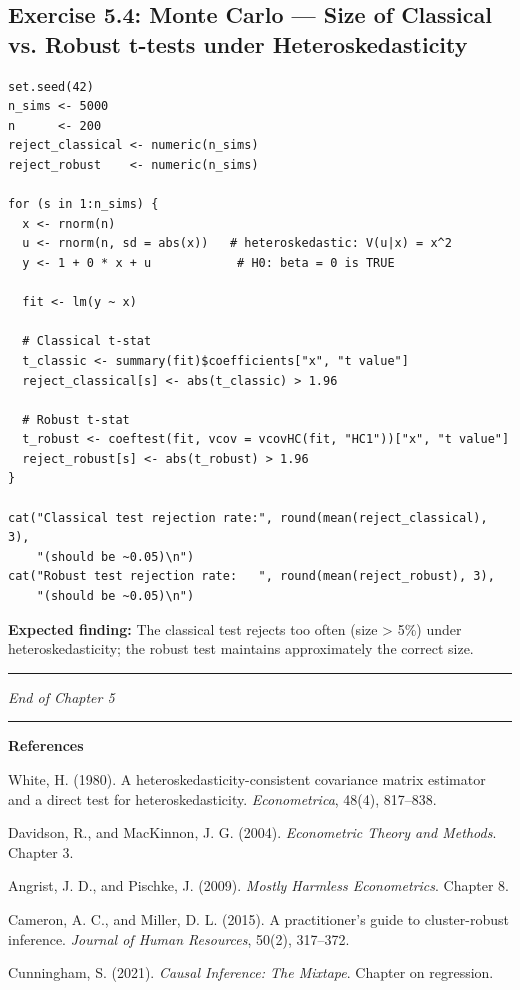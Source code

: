 \subsection{Exercise 5.4: Monte Carlo --- Size of Classical vs. Robust t-tests under Heteroskedasticity}

\begin{lstlisting}
set.seed(42)
n_sims <- 5000
n      <- 200
reject_classical <- numeric(n_sims)
reject_robust    <- numeric(n_sims)

for (s in 1:n_sims) {
  x <- rnorm(n)
  u <- rnorm(n, sd = abs(x))   # heteroskedastic: V(u|x) = x^2
  y <- 1 + 0 * x + u            # H0: beta = 0 is TRUE

  fit <- lm(y ~ x)
  
  # Classical t-stat
  t_classic <- summary(fit)$coefficients["x", "t value"]
  reject_classical[s] <- abs(t_classic) > 1.96
  
  # Robust t-stat
  t_robust <- coeftest(fit, vcov = vcovHC(fit, "HC1"))["x", "t value"]
  reject_robust[s] <- abs(t_robust) > 1.96
}

cat("Classical test rejection rate:", round(mean(reject_classical), 3),
    "(should be ~0.05)\n")
cat("Robust test rejection rate:   ", round(mean(reject_robust), 3),
    "(should be ~0.05)\n")
\end{lstlisting}

\textbf{Expected finding:} The classical test rejects too often (size > 5\%) under heteroskedasticity; the robust test maintains approximately the correct size.

\medskip\hrule\medskip

\textit{End of Chapter 5}

\medskip\hrule\medskip

\textbf{References}

White, H. (1980). A heteroskedasticity-consistent covariance matrix estimator and a direct test for heteroskedasticity. \textit{Econometrica}, 48(4), 817--838.

Davidson, R., and MacKinnon, J. G. (2004). \textit{Econometric Theory and Methods}. Chapter 3.

Angrist, J. D., and Pischke, J. (2009). \textit{Mostly Harmless Econometrics}. Chapter 8.

Cameron, A. C., and Miller, D. L. (2015). A practitioner's guide to cluster-robust inference. \textit{Journal of Human Resources}, 50(2), 317--372.

Cunningham, S. (2021). \textit{Causal Inference: The Mixtape}. Chapter on regression.
